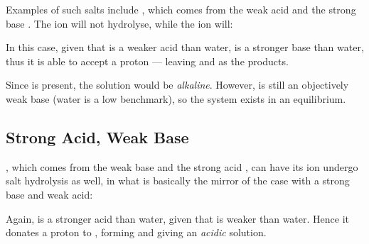 			Examples of such salts include , which comes from the weak acid  and the strong base .
			The  ion will not hydrolyse, while the  ion will:


			In this case, given that  is a weaker acid than water,  is a stronger base than water, thus it is
			able to accept a proton --- leaving  and  as the products.

			Since  is present, the solution would be \textit{alkaline}. However,  is still an objectively weak base
			(water is a low benchmark), so the system exists in an equilibrium.



		\subsection{Strong Acid, Weak Base}
			, which comes from the weak base  and the strong acid , can have its  ion undergo
			salt hydrolysis as well, in what is basically the mirror of the case with a strong base and weak acid:


			Again,  is a stronger acid than water, given that  is weaker than water. Hence it donates a proton to ,
			forming  and giving an \textit{acidic} solution.

